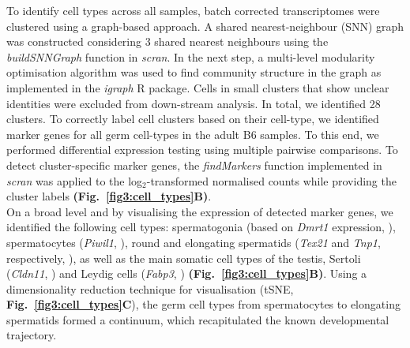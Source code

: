 To identify cell types across all samples, batch corrected transcriptomes were clustered using a graph-based approach. A shared nearest-neighbour (SNN) graph \citep{Xu2015} was constructed considering 3 shared nearest neighbours using the \emph{buildSNNGraph} function in \emph{scran}. In the next step, a multi-level modularity optimisation algorithm was used to find community structure in the graph \citep{Blondel2008} as implemented in the \emph{igraph} R package. Cells in small clusters that show unclear identities were excluded from down-stream analysis. In total, we identified 28 clusters. To correctly label cell clusters based on their cell-type, we identified marker genes for all germ cell-types in the adult B6 samples. To this end, we performed differential expression testing using multiple pairwise comparisons. To detect cluster-specific marker genes, the \emph{findMarkers} function implemented in \emph{scran} was applied to the log$_2$-transformed normalised counts while providing the cluster labels \textbf{(Fig.~\ref{fig3:cell_types}B)}. \\

On a broad level and by visualising the expression of detected marker genes, we identified the following cell types: spermatogonia (based on \textit{Dmrt1} expression, \citep{Matson2010}), spermatocytes (\textit{Piwil1}, \citep{Deng2002}), round and elongating spermatids (\textit{Tex21} and \textit{Tnp1}, respectively, \citep{Fujii2002}), as well as the main somatic cell types of the testis, Sertoli (\textit{Cldn11}, \citep{Mazaud-Guittot2010}) and Leydig cells (\textit{Fabp3}, \citep{Oresti2013}) \textbf{(Fig.~\ref{fig3:cell_types}B)}. Using a dimensionality reduction technique for visualisation (tSNE, \textbf{Fig.~\ref{fig3:cell_types}C}), the germ cell types from spermatocytes to elongating spermatids formed a continuum, which recapitulated the known developmental trajectory.

\newpage

